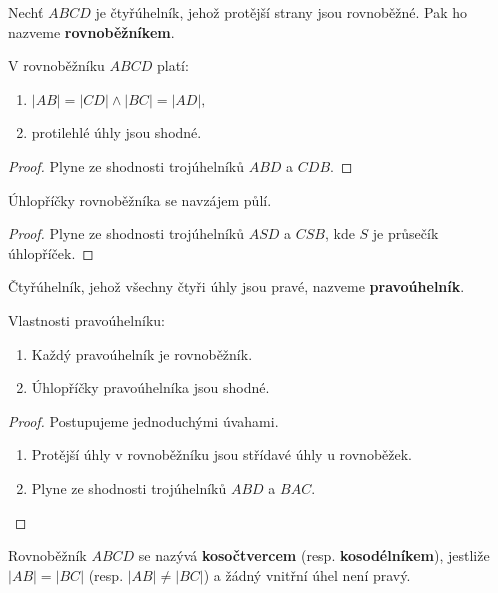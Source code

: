 \begin{definition}
  Nechť $ABCD$ je čtyřúhelník, jehož protější strany jsou rovnoběžné. Pak ho nazveme \textbf{rovnoběžníkem}.
\end{definition}

\begin{veta}
  V rovnoběžníku $ABCD$ platí:
  \begin{enumerate}[$i.$]
    \item $|AB|=|CD| \land |BC|=|AD|,$
    \item protilehlé úhly jsou shodné.
  \end{enumerate}
\end{veta}

\begin{proof}
  Plyne ze shodnosti trojúhelníků $ABD$ a $CDB.$
\end{proof}

\begin{veta}
  Úhlopříčky rovnoběžníka se navzájem půlí.
\end{veta}


\begin{proof}
  Plyne ze shodnosti trojúhelníků $ASD$ a $CSB$, kde $S$ je průsečík úhlopříček.
\end{proof}

\begin{definition}
  Čtyřúhelník, jehož všechny čtyři úhly jsou pravé, nazveme \textbf{pravoúhelník}.
\end{definition}

\begin{veta} Vlastnosti pravoúhelníku:
  \begin{enumerate}[$i.$]
    \item Každý pravoúhelník je rovnoběžník.
    \item Úhlopříčky pravoúhelníka jsou shodné.
  \end{enumerate}
\end{veta}

\begin{proof} Postupujeme jednoduchými úvahami.
  \begin{enumerate}[$i.$]
    \item Protější úhly v rovnoběžníku jsou střídavé úhly u rovnoběžek.
    \item Plyne ze shodnosti trojúhelníků $ABD$ a $BAC$.\qedhere
  \end{enumerate}
\end{proof}

\begin{definition}
  Rovnoběžník $ABCD$ se nazývá \textbf{kosočtvercem} (resp. \textbf{kosodélníkem}), jestliže $|AB|=|BC|$ (resp. $|AB| \neq |BC|$) a žádný vnitřní úhel není pravý.
\end{definition}


